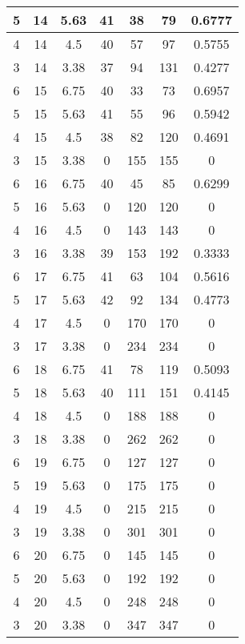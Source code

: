 \documentclass[letterpaper, 12pt]{article}
\begin{document}
\begin{longtable}{|c|c|c|c|c|c|c|}
\hline
5 & 14 & 5.63 & 41 & 38 & 79 & 0.6777 \\
\hline
4 & 14 & 4.5 & 40 & 57 & 97 & 0.5755 \\
\hline
3 & 14 & 3.38 & 37 & 94 & 131 & 0.4277 \\
\hline
6 & 15 & 6.75 & 40 & 33 & 73 & 0.6957 \\
\hline
5 & 15 & 5.63 & 41 & 55 & 96 & 0.5942 \\
\hline
4 & 15 & 4.5 & 38 & 82 & 120 & 0.4691 \\
\hline
3 & 15 & 3.38 & 0 & 155 & 155 & 0 \\
\hline
6 & 16 & 6.75 & 40 & 45 & 85 & 0.6299 \\
\hline
5 & 16 & 5.63 & 0 & 120 & 120 & 0 \\
\hline
4 & 16 & 4.5 & 0 & 143 & 143 & 0 \\
\hline
3 & 16 & 3.38 & 39 & 153 & 192 & 0.3333 \\
\hline
6 & 17 & 6.75 & 41 & 63 & 104 & 0.5616 \\
\hline
5 & 17 & 5.63 & 42 & 92 & 134 & 0.4773 \\
\hline
4 & 17 & 4.5 & 0 & 170 & 170 & 0 \\
\hline
3 & 17 & 3.38 & 0 & 234 & 234 & 0 \\
\hline
6 & 18 & 6.75 & 41 & 78 & 119 & 0.5093 \\
\hline
5 & 18 & 5.63 & 40 & 111 & 151 & 0.4145 \\
\hline
4 & 18 & 4.5 & 0 & 188 & 188 & 0 \\
\hline
3 & 18 & 3.38 & 0 & 262 & 262 & 0 \\
\hline
6 & 19 & 6.75 & 0 & 127 & 127 & 0 \\
\hline
5 & 19 & 5.63 & 0 & 175 & 175 & 0 \\
\hline
4 & 19 & 4.5 & 0 & 215 & 215 & 0 \\
\hline
3 & 19 & 3.38 & 0 & 301 & 301 & 0 \\
\hline
6 & 20 & 6.75 & 0 & 145 & 145 & 0 \\
\hline
5 & 20 & 5.63 & 0 & 192 & 192 & 0 \\
\hline
4 & 20 & 4.5 & 0 & 248 & 248 & 0 \\
\hline
3 & 20 & 3.38 & 0 & 347 & 347 & 0 \\
\hline
\end{longtable}
\end{document}
